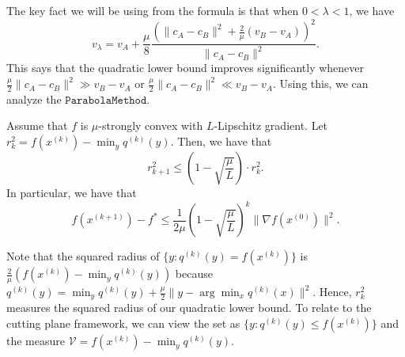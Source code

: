 The key fact we will be using from the formula is that when $0<\lambda<1$,
we have
\[
v_{\lambda}=v_{A}+\frac{\mu}{8}\frac{(\|c_{A}-c_{B}\|^{2}+\frac{2}{\mu}(v_{B}-v_{A}))^{2}}{\|c_{A}-c_{B}\|^{2}}.
\]
This says that the quadratic lower bound improves significantly whenever
$\frac{\mu}{2}\|c_{A}-c_{B}\|^{2}\gg v_{B}-v_{A}$ or $\frac{\mu}{2}\|c_{A}-c_{B}\|^{2}\ll v_{B}-v_{A}$.
Using this, we can analyze the $\mathtt{ParabolaMethod}$.
\begin{thm}
\label{lem:geometric_convergence_rate-1}Assume that $f$ is $\mu$-strongly
convex with $L$-Lipschitz gradient. Let $r^{2}_{k}=f(x^{(k)})-\min_{y}q^{(k)}(y)$.
Then, we have that
\[
r^{2}_{k+1}\leq(1-\sqrt{\frac{\mu}{L}})\cdot r^{2}_{k}.
\]
In particular, we have that
\[
f(x^{(k+1)})-f^{*}\leq\frac{1}{2\mu}(1-\sqrt{\frac{\mu}{L}})^{k}\|\nabla f(x^{(0)})\|^{2}.
\]
\end{thm}

\begin{rem}
Note that the squared radius of $\{y:q^{(k)}(y)=f(x^{(k)})\}$ is
$\frac{2}{\mu}(f(x^{(k)})-\min_{y}q^{(k)}(y))$ because $q^{(k)}(y)=\min_{y}q^{(k)}(y)+\frac{\mu}{2}\|y-\arg\min_{x}q^{(k)}(x)\|^{2}$.
Hence, $r^{2}_{k}$ measures the squared radius of our quadratic lower
bound. To relate to the cutting plane framework, we can view the set
as $\{y:q^{(k)}(y)\leq f(x^{(k)})\}$ and the measure $\mathcal{V}=f(x^{(k)})-\min_{y}q^{(k)}(y)$.
\end{rem}

